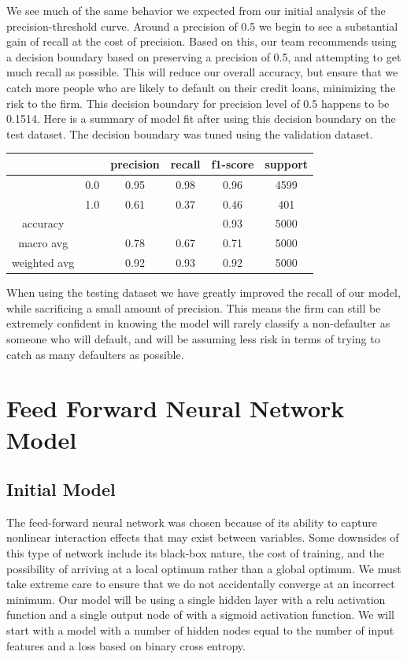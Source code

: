 \documentclass[12pt]{article}
\begin{document}
	We see much of the same behavior we expected from our initial analysis of the precision-threshold curve. Around a precision of 0.5 we begin to see a substantial gain of recall at the cost of precision. Based on this, our team recommends using a decision boundary based on preserving a precision of 0.5, and attempting to get much recall as possible. This will reduce our overall accuracy, but ensure that we catch more people who are likely to default on their credit loans, minimizing the risk to the firm. This decision boundary for precision level of 0.5 happens to be 0.1514. Here is a summary of model fit after using this decision boundary on the test dataset. The decision boundary was tuned using the validation dataset. 
	
	
	\begin{tabular}{c|c|c|c|c|c}
	\hline
				& 		& 	precision &  recall  & f1-score   & support \\ \hline
	
				&  0.0	&		0.95 &     0.98   &  0.96   &  4599 \\ \hline
				&  1.0  &		0.61 &     0.37   &  0.46   &   401 \\ \hline
	
	accuracy    & & & &                       		  0.93   &   5000 \\ \hline
	macro avg   & &   			0.78   &   0.67  &    0.71   &   5000  \\ \hline
	weighted avg  & &   		0.92   &   0.93  &    0.92   &   5000 \\ \hline
	\end{tabular}	
	 
	
	When using the testing dataset we have greatly improved the recall of our model, while sacrificing a small amount of precision. This means the firm can still be extremely confident in knowing the model will rarely classify a non-defaulter as someone who will default, and will be assuming less risk in terms of trying to catch as many defaulters as possible. 
	
	
	\section{Feed Forward Neural Network Model}
	
	\subsection{Initial Model}
	
	The feed-forward neural network was chosen because of its ability to capture nonlinear interaction effects that may exist between variables. Some downsides of this type of network include its black-box nature, the cost of training, and the possibility of arriving at a local optimum rather than a global optimum. We must take extreme care to ensure that we do not accidentally converge at an incorrect minimum. Our model will be using a single hidden layer with a relu activation function and a single output node of with a sigmoid activation function. We will start with a model with a number of hidden nodes equal to the number of input features and a loss based on binary cross entropy. 
	
\end{document}
